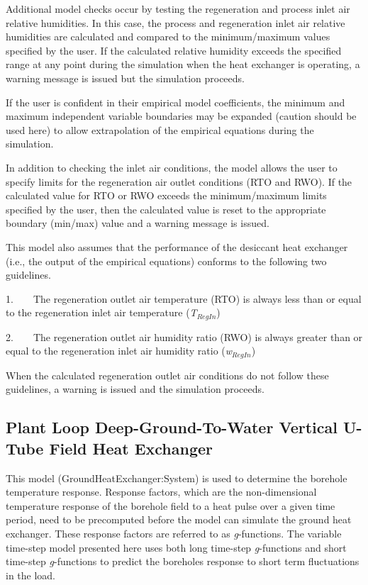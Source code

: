 Additional model checks occur by testing the regeneration and process inlet air relative humidities. In this case, the process and regeneration inlet air relative humidities are calculated and compared to the minimum/maximum values specified by the user. If the calculated relative humidity exceeds the specified range at any point during the simulation when the heat exchanger is operating, a warning message is issued but the simulation proceeds.

If the user is confident in their empirical model coefficients, the minimum and maximum independent variable boundaries may be expanded (caution should be used here) to allow extrapolation of the empirical equations during the simulation.

In addition to checking the inlet air conditions, the model allows the user to specify limits for the regeneration air outlet conditions (RTO and RWO). If the calculated value for RTO or RWO exceeds the minimum/maximum limits specified by the user, then the calculated value is reset to the appropriate boundary (min/max) value and a warning message is issued.

This model also assumes that the performance of the desiccant heat exchanger (i.e., the output of the empirical equations) conforms to the following two guidelines.

1.~~~~The regeneration outlet air temperature (RTO) is always less than or equal to the regeneration inlet air temperature (\emph{T\(_{RegIn}\)})

2.~~~~The regeneration outlet air humidity ratio (RWO) is always greater than or equal to the regeneration inlet air humidity ratio (\emph{w\(_{RegIn}\)})

When the calculated regeneration outlet air conditions do not follow these guidelines, a warning is issued and the simulation proceeds.

\subsection{Plant Loop Deep-Ground-To-Water Vertical U-Tube Field Heat Exchanger}\label{plant-loop-deep-ground-to-water-vertical-u-tube-field-heat-exchanger}

This model (GroundHeatExchanger:System) is used to determine the borehole temperature response. Response factors, which are the non-dimensional temperature response of the borehole field to a heat pulse over a given time period, need to be precomputed before the model can simulate the ground heat exchanger. These response factors are referred to as \emph{g}-functions. The variable time-step model presented here uses both long time-step \emph{g}-functions and short time-step \emph{g}-functions to predict the boreholes response to short term fluctuations in the load.

